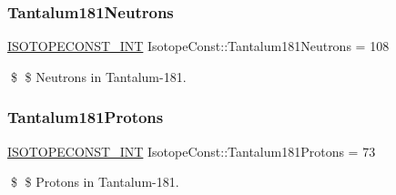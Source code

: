 \subsubsection{\texorpdfstring{Tantalum181\+Neutrons}{Tantalum181Neutrons}}
{\footnotesize\ttfamily \mbox{\hyperlink{group___isotope_const-_macros_ga5f18360b3e99483a35c32d789e62621c}{I\+S\+O\+T\+O\+P\+E\+C\+O\+N\+S\+T\+\_\+\+I\+NT}} Isotope\+Const\+::\+Tantalum181\+Neutrons = 108}

\$ \$ Neutrons in Tantalum-\/181. \mbox{\label{group___isotope_const-_tantalum-_ta181_gaab8702fc1d176e7bee902aa9560af53f}} 
\subsubsection{\texorpdfstring{Tantalum181\+Protons}{Tantalum181Protons}}
{\footnotesize\ttfamily \mbox{\hyperlink{group___isotope_const-_macros_ga5f18360b3e99483a35c32d789e62621c}{I\+S\+O\+T\+O\+P\+E\+C\+O\+N\+S\+T\+\_\+\+I\+NT}} Isotope\+Const\+::\+Tantalum181\+Protons = 73}

\$ \$ Protons in Tantalum-\/181. 